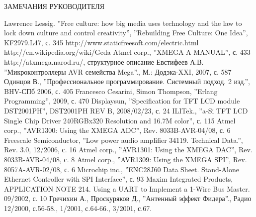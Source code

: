 \documentclass[russian,utf8,14pt,emptystyle,pointsubsection,reduceheight=0mm]{eskdtext}
\begin{document}
\pagestyle{plain}
\thispagestyle{empty}

\newpage{}

\begin{center}
\MakeUppercase{ЗАМЕЧАНИЯ РУКОВОДИТЕЛЯ}
\end{center}
\newpage{}


\newpage{}

\setcounter{page}{3}
\tableofcontents
\newpage{}

%





















\begin{thebibliography}{99}
 Lawrence Lessig. ''Free culture: how big media uses technology and the law to lock down culture and control creativity'', ''Rebuilding Free Culture: One Idea'', KF2979.L47, с. 345
 http://www.staticfreesoft.com/electric.html
 http://en.wikipedia.org/wiki/Geda
 Atmel corp., ''XMEGA A MANUAL'', с. 433
 http://atxmega.narod.ru/, структурное описание
 Евстифеев А.В. ''Микроконтроллеры AVR семейства Mega''., М.: Додэка-XXI, 2007, с. 587
 Одинцов В., ''Профессиональное программирование. Системный подход. 2 изд.'', BHV-СПб 2006, с. 405
 Francesco Cesarini, Simon Thompson, ''Erlang Programming'', 2009, с. 470
 Displaysun, ''Specification for TFT LCD module DST2001PH'', DST2001PH REV B, 2008/02/23, с. 24
 ILITek., ''a-Si TFT LCD Single Chip Driver 240RGBx320 Resolution and 16.7M color'', с. 115
 Atmel corp., ''AVR1300: Using the XMEGA ADC'', Rev. 8033B-AVR-04/08, с. 6
 Freescale Semiconductor, ''Low power audio amplifier 34119. Technical Data.'', Rev. 3.0, 12/2006, с. 16
 Atmel corp., ''AVR1301: Using the XMEGA DAC'', Rev. 8033B-AVR-04/08, с. 8
 Atmel corp., ''AVR1309: Using the XMEGA SPI'', Rev. 8057A-AVR-02/08, с. 6
 Microchip inc., ''ENC28J60 Data Sheet. Stand-Alone Ethernet Controller with SPI Interface'', с. 93
 Maxim Integrated Products, APPLICATION NOTE 214. Using a UART to Implement a 1-Wire Bus Master. 09/2002, с. 10
 Гречихин А., Проскуряков Д., ''Антенный эффект Фидера''., Радио 12/2000, с.56-58., 1/2001, с.64-66., 3/2001, с.67.
\end{thebibliography}


\end{document}
